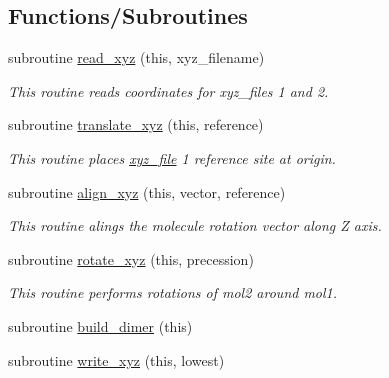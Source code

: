 \subsection*{Functions/\+Subroutines}
\begin{DoxyCompactItemize}
\item 
subroutine \hyperlink{namespacemod__read__xyz_aab6d00fb6cfd2cad4e18f8cb69deb456}{read\+\_\+xyz} (this, xyz\+\_\+filename)
\begin{DoxyCompactList}\small\item\em This routine reads coordinates for xyz\+\_\+files 1 and 2. \end{DoxyCompactList}\item 
subroutine \hyperlink{namespacemod__read__xyz_a28a0648307ac1a30adc5bf4571709a58}{translate\+\_\+xyz} (this, reference)
\begin{DoxyCompactList}\small\item\em This routine places \hyperlink{structmod__read__xyz_1_1xyz__file}{xyz\+\_\+file} 1 reference site at origin. \end{DoxyCompactList}\item 
subroutine \hyperlink{namespacemod__read__xyz_a6f62f86e40973634abc710a8c5b9db23}{align\+\_\+xyz} (this, vector, reference)
\begin{DoxyCompactList}\small\item\em This routine alings the molecule rotation vector along Z axis. \end{DoxyCompactList}\item 
subroutine \hyperlink{namespacemod__read__xyz_ab1b3f67fa055b9311858ca333970405e}{rotate\+\_\+xyz} (this, precession)
\begin{DoxyCompactList}\small\item\em This routine performs rotations of mol2 around mol1. \end{DoxyCompactList}\item 
subroutine \hyperlink{namespacemod__read__xyz_ab27344d0596837a5864730e51a5826af}{build\+\_\+dimer} (this)
\item 
subroutine \hyperlink{namespacemod__read__xyz_a86235488f0f7fd76cccfa75734903206}{write\+\_\+xyz} (this, lowest)
\end{DoxyCompactItemize}
